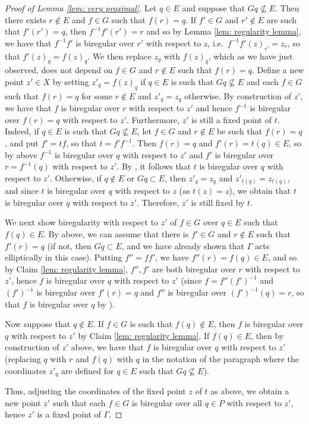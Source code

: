\documentclass[12pt]{article}
\theoremstyle{definition}
\begin{document}
\begin{proof} [Proof of Lemma \ref{lem: very proximal}]
             Let $q \in E$ and suppose that $Gq \nsubseteq E$. Then there exists $r \notin E$ and $f \in G$ such that $f(r) = q$. If $f' \in G$ and $r' \notin E$ are such that $f'(r') = q$, then $f^{-1}f'(r') = r$ and so by Lemma \ref{lem: regularity lemma}, we have that $f^{-1}f'$ is biregular over $r'$ with respect to $z$, i.e.\ $f^{-1}f'(z)_{r'} = z_r$, so that $f'(z)_q = f(z)_q$. We then replace $z_q$ with $f(z)_q$, which as we have just observed, does not depend on $f \in G$ and $r \notin E$ such that $f(r) = q$. Define a new point $z' \in X$ by setting $z'_q = f(z)_q$ if $q \in E$ is such that $Gq \nsubseteq E$ and each $f \in G$ such that $f(r) = q$ for some $r \notin E$ and $z'_q = z_q$ otherwise. By construction of $z'$, we have that $f$ is biregular over $r$ with respect to $z'$ and hence $f^{-1}$ is biregular over $f(r) = q$ with respect to $z'$. Furthermore, $z'$ is still a fixed point of $t$. Indeed, if $q \in E$ is such that $Gq \nsubseteq E$, let $f \in G$ and $r \notin E$ be such that $f(r) = q$, and put $f' = tf$, so that $t = f'f^{-1}$. Then $f(r) = q$ and $f'(r) = t(q) \in E$, so by above $f^{-1}$ is biregular over $q$ with respect to $z'$ and $f'$ is biregular over $r = f^{-1}(q)$ with respect to $z'$. By \cite[Remark 4.4]{Algebraic}, it follows that $t$ is biregular over $q$ with respect to $z'$. Otherwise, if $q \notin E$ or $Gq \subset E$, then $z'_q= z_q$ and $z'_{t(q)} = z_{t(q)}$, and since $t$ is biregular over $q$ with respect to $z$ (as $t(z) = z$), we obtain that $t$ is biregular over $q$ with respect to $z'$. Therefore, $z'$ is still fixed by $t$.

            We next show biregularity with respect to $z'$ of $f \in G$ over $q \in E$ such that $f(q) \in E$. By above, we can assume that there is $f' \in G$ and $r \notin E$ such that $f'(r) = q$ (if not, then $Gq \subset E$, and we have already shown that $\Gamma$ acts elliptically in this case). Putting $f'' = ff'$, we have $f''(r) = f(q) \in E$, and so by Claim \ref{lem: regularity lemma}, $f'',f'$ are both biregular over $r$ with respect to $z'$, hence $f$ is biregular over $q$ with respect to $z'$ (since $f = f''(f')^{-1}$ and $(f')^{-1}$ is biregular over $f'(r) = q$ and $f''$ is biregular over $(f')^{-1}(q) = r$, so that $f$ is biregular over $q$ by \cite[Remark 4.4]{Algebraic}).

            Now suppose that $q \notin E$. If $f \in G$ is such that $f(q) \notin E$, then $f$ is biregular over $q$ with respect to $z'$ by Claim \ref{lem: regularity lemma}. If $f(q) \in E$, then by construction of $z'$ above, we have that $f$ is biregular over $q$ with respect to $z'$ (replacing $q$ with $r$ and $f(q)$ with $q$ in the notation of the paragraph where the coordinates $z'_q$ are defined for $q \in E$ such that $Gq \nsubseteq E$). 

            Thus, adjusting the coordinates of the fixed point $z$ of $t$ as above, we obtain a new point $z'$ such that each $f \in G$ is biregular over all $q \in P$ with respect to $z'$, hence $z'$ is a fixed point of $\Gamma$. 
    
\end{proof}
\end{document}
